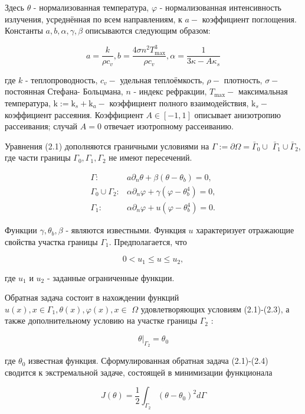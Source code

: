 \documentclass[10pt]{article}
\begin{document}
Здесь $\theta$ - нормализованная температура, $\varphi$ - нормализованная интенсивность излучения, усреднённая по всем направлениям, к $a-$ коэффициент поглощения. Константы $a, b, \alpha, \gamma, \beta$ описываются следующим образом:

$$
a=\frac{k}{\rho c_{v}}, b=\frac{4 \sigma n^{2} T_{\max }^{3}}{\rho c_{v}}, \alpha=\frac{1}{3 \kappa-A \kappa_{s}}
$$

где $k$ - теплопроводность, $c_{v}-$ удельная теплоёмкость, $\rho-$ плотность, $\sigma-$ постоянная Стефана- Больцмана, $n$ - индекс рефракции, $T_{\max }-$ максимальная температура, $\mathrm{k}:=\mathrm{k}_{s}+\mathrm{k}_{a}-$ коэффициент полного взаимодействия, $\mathrm{k}_{s}-$ коэффициент рассеяния. Коэффициент $A \in[-1,1]$ описывает анизотропию рассеивания; случай $A=0$ отвечает изотропному рассеиванию.

Уравнения (2.1) дополняются граничными условиями на $\Gamma:=\partial \Omega=\bar{\Gamma}_{0} \cup$ $\bar{\Gamma}_{1} \cup \bar{\Gamma}_{2}$, где части границы $\Gamma_{0}, \Gamma_{1}, \Gamma_{2}$ не имеют пересечений.

$$
\begin{aligned}
\Gamma: & a \partial_{n} \theta+\beta\left(\theta-\theta_{b}\right)=0, \\
\Gamma_{0} \cup \Gamma_{2}: & \alpha \partial_{n} \varphi+\gamma\left(\varphi-\theta_{b}^{4}\right)=0, \\
\Gamma_{1}: & \alpha \partial_{n} \varphi+u\left(\varphi-\theta_{b}^{4}\right)=0 .
\end{aligned}
$$

Функции $\gamma, \theta_{b}, \beta$ - являются известными. Функция $u$ характеризует отражающие свойства участка границы $\Gamma_{1}$. Предполагается, что

$$
0<u_{1} \leqslant u \leqslant u_{2},
$$

где $u_{1}$ и $u_{2}$ - заданные ограниченные функции.

Обратная задача состоит в нахождении функций $u(x), x \in \Gamma_{1}, \theta(x), \varphi(x), x \in$ $\Omega$ удовлетворяющих условиям (2.1)-(2.3), а также дополнительному условию на участке границы $\Gamma_{2}$ :

$$
\left.\theta\right|_{\Gamma_{2}}=\theta_{0}
$$

где $\theta_{0}$ известная функция. Сформулированная обратная задача (2.1)-(2.4) сводится к экстремальной задаче, состоящей в минимизации функционала

$$
J(\theta)=\frac{1}{2} \int_{\Gamma_{2}}\left(\theta-\theta_{0}\right)^{2} d \Gamma
$$
\end{document}

